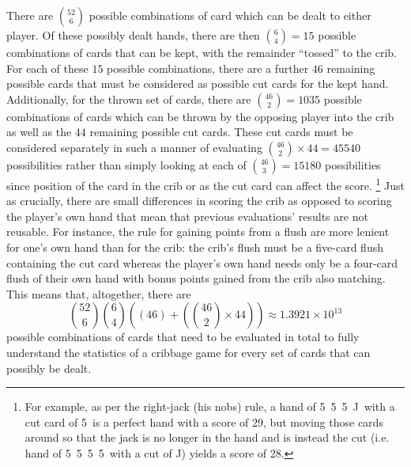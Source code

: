There are ${52 \choose 6}$ possible combinations of card which can be dealt to
either player.
%
Of these possibly dealt hands, there are then ${6 \choose 4} = 15$ possible
combinations of cards that can be kept,
with the remainder ``tossed'' to the crib.
%
For each of these $15$ possible combinations,
there are a further $46$ remaining possible cards
that must be considered as possible cut cards for the kept hand.
%
Additionally, for the thrown set of cards,
there are ${46 \choose 2} = 1035$ possible combinations of cards which can be
thrown by the opposing player into the crib as well as the
$44$ remaining possible cut cards.
%
These cut cards must be considered separately in such a manner of
evaluating ${46 \choose 2} \times 44 = 45540$ possibilities rather than
simply looking at each of ${46 \choose 3} = 15180$ possibilities
since position of the card in the crib or as the cut card can affect the score.%
\footnote{
	For example, as per the right-jack (his nobs) rule,
	a hand of 5\clubs\ 5\hearts\ 5\spades\ J\diamonds\ 
	with a cut card of 5\diamonds\ is a perfect hand
	with a score of 29,
	but moving those cards around so that the jack is no longer in the hand
	and is instead the cut
	(i.e. hand of 5\clubs\ 5\hearts\ 5\spades\ 5\diamonds\
	with a cut of J\diamonds)
	yields a score of 28.
}
%
Just as crucially, there are small differences in scoring the crib as opposed to
scoring the player's own hand that mean that previous evaluations' results are
not reusable.
%
For instance, the rule for gaining points from a flush are more lenient for
one's own hand than for the crib:
the crib's flush must be a five-card flush containing the cut card
whereas the player's own hand needs only be a four-card flush of their own
hand with bonus points gained from the crib also matching.
%
This means that, altogether, there are 
\[
	{52 \choose 6}
	{6 \choose 4}
	\left(
		\left(46\right) +
		\left(
			{46 \choose 2} \times 44
		\right)
	\right)
	\approx
	1.3921 \times {10}^{13}
\]
possible combinations of cards that need to be evaluated in total to fully 
understand the statistics
of a cribbage game for every set of cards that can possibly be dealt.

